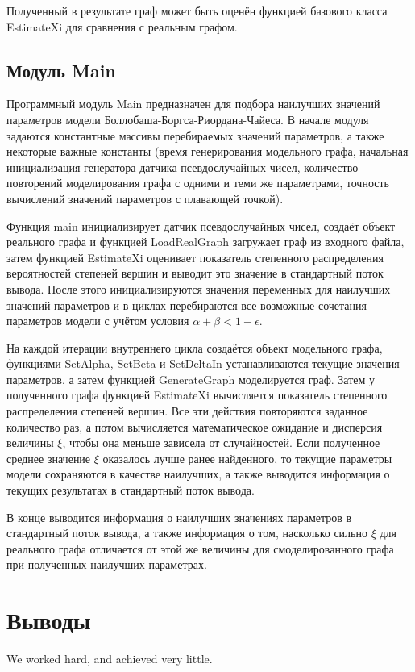 \documentclass[14pt]{extreport}
\begin{document}
Полученный в результате граф может быть оценён функцией базового класса EstimateXi для сравнения с реальным графом.

\section{Модуль Main}

Программный модуль Main предназначен для подбора наилучших значений параметров модели Боллобаша-Боргса-Риордана-Чайеса. В начале модуля задаются константные массивы перебираемых значений параметров, а также некоторые важные константы (время генерирования модельного графа, начальная инициализация генератора датчика псевдослучайных чисел, количество повторений моделирования графа с одними и теми же параметрами, точность вычислений значений параметров с плавающей точкой).

Функция main инициализирует датчик псевдослучайных чисел, создаёт объект реального графа и функцией LoadRealGraph загружает граф из входного файла, затем функцией EstimateXi оценивает показатель степенного распределения вероятностей степеней вершин и выводит это значение в стандартный поток вывода. После этого инициализируются значения переменных для наилучших значений параметров и в циклах перебираются все возможные сочетания параметров модели с учётом условия $\alpha + \beta < 1 - \epsilon$.

На каждой итерации внутреннего цикла создаётся объект модельного графа, функциями SetAlpha, SetBeta и SetDeltaIn устанавливаются текущие значения параметров, а затем функцией GenerateGraph моделируется граф. Затем у полученного графа функцией EstimateXi вычисляется показатель степенного распределения степеней вершин. Все эти действия повторяются заданное количество раз, а потом вычисляется математическое ожидание и дисперсия величины $\xi$, чтобы она меньше зависела от случайностей. Если полученное среднее значение $\xi$ оказалось лучше ранее найденного, то текущие параметры модели сохраняются в качестве наилучших, а также выводится информация о текущих результатах в стандартный поток вывода.

В конце выводится информация о наилучших значениях параметров в стандартный поток вывода, а также информация о том, насколько сильно $\xi$ для реального графа отличается от этой же величины для смоделированного графа при полученных наилучших параметрах.

\chapter{Выводы}
We worked hard, and achieved very little.
\end{document}
